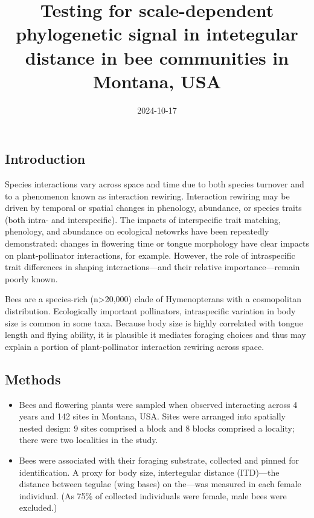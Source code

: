 \documentclass[
]{article}
\title{Testing for scale-dependent phylogenetic signal in intetegular
distance in bee communities in Montana, USA}
\author{}
\date{\vspace{-2.5em}2024-10-17}
\providecommand{\tightlist}{%
  \setlength{\itemsep}{0pt}\setlength{\parskip}{0pt}}
\begin{document}
\maketitle

\subsection{Introduction}\label{introduction}

Species interactions vary across space and time due to both species
turnover and to a phenomenon known as interaction rewiring. Interaction
rewiring may be driven by temporal or spatial changes in phenology,
abundance, or species traits (both intra- and interspecific). The
impacts of interspecific trait matching, phenology, and abundance on
ecological netowrks have been repeatedly demonstrated: changes in
flowering time or tongue morphology have clear impacts on
plant-pollinator interactions, for example. However, the role of
intraspecific trait differences in shaping interactions---and their
relative importance---remain poorly known.

Bees are a species-rich (n\textgreater20,000) clade of Hymenopterans
with a cosmopolitan distribution. Ecologically important pollinators,
intraspecific variation in body size is common in some taxa. Because
body size is highly correlated with tongue length and flying ability, it
is plausible it mediates foraging choices and thus may explain a portion
of plant-pollinator interaction rewiring across space.

\subsection{Methods}\label{methods}

\begin{itemize}
\tightlist
\item
  Bees and flowering plants were sampled when observed interacting
  across 4 years and 142 sites in Montana, USA. Sites were arranged into
  spatially nested design: 9 sites comprised a block and 8 blocks
  comprised a locality; there were two localities in the study.
\item
  Bees were associated with their foraging substrate, collected and
  pinned for identification. A proxy for body size, intertegular
  distance (ITD)---the distance between tegulae (wing bases) on
  the---was measured in each female individual. (As 75\% of collected
  individuals were female, male bees were excluded.)
\end{itemize}
\end{document}
